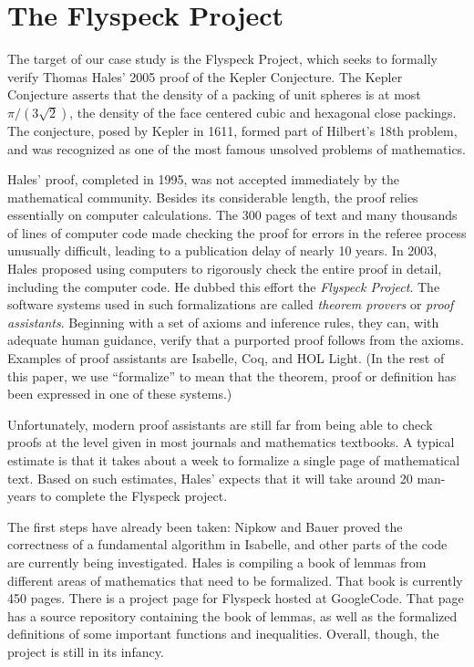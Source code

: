 
\section{The Flyspeck Project}
\label{sec:flyspeck}
  The target of our case study is the Flyspeck Project, which seeks
to formally verify Thomas Hales' 2005 proof of the Kepler Conjecture.  
The Kepler Conjecture asserts that the density of a packing of unit spheres
is at most $\pi/(3\sqrt{2})$, the density of the face centered cubic and 
hexagonal close packings.  The conjecture, posed by Kepler in 1611, formed part
of Hilbert's 18th problem, and was recognized as one of the most famous unsolved
problems of mathematics.    

  Hales' proof, completed in 1995, was not accepted immediately by the mathematical community. 
Besides its considerable length,  the proof relies essentially on computer calculations.  
The 300 pages of text and many thousands of lines of computer code made
checking the proof for errors in the referee process unusually difficult,
leading to a publication delay of nearly 10 years.  
In 2003, Hales proposed using computers to rigorously check the entire proof in
detail, including the computer code.  He dubbed this
effort the \textit{Flyspeck Project}.  
The software systems used in such formalizations are called \textit{theorem provers}
or \textit{proof assistants}.
Beginning with a set of axioms and inference rules, they can,
with adequate human guidance, verify that a purported proof follows from the axioms.  
Examples of proof assistants are Isabelle\cite{Paulson:1994:Isabelle}, 
Coq\cite{Bertot:2004:CoqBook}, 
and HOL Light\cite{Harrison:2000:HOL-Light}. (In the rest of this paper, we use ``formalize'' to mean
that the theorem, proof or definition has been expressed in one of these systems.) 

  Unfortunately, modern proof assistants are still far from being able to check
proofs at the level given in most journals and mathematics textbooks.  A typical
estimate is that it takes about a week to formalize a single page of mathematical
text.  Based on such estimates, Hales' expects that it will take 
around 20 man-years to complete the Flyspeck project.  

The first steps have already been taken:  Nipkow and
Bauer\cite{Nipkow:2005:Tame} proved the correctness of a 
fundamental algorithm in Isabelle, and other parts of the code are
currently being investigated.  Hales is compiling a book\cite{Hales:2007:FlyspeckBook}
of lemmas from different areas of mathematics that need to be formalized.    
That book is currently 450 pages.  
There is a project page\cite{website:FlyspeckProjectPage}
for Flyspeck hosted at GoogleCode\cite{website:GoogleCode}.  That page has a source repository
containing the book of lemmas, as well as the formalized definitions of some important functions
and inequalities.  Overall, though, the project is still in its infancy.
